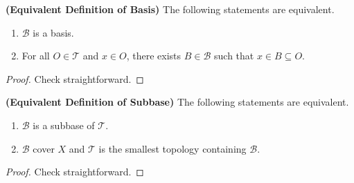 \documentclass{report}
\begin{document}
\begin{theorem}
  \textbf{(Equivalent Definition of Basis)} The following statements are equivalent.
\begin{enumerate}[label=(\alph*)]
  \item $\mathcal{B}$ is a basis.
  \item For all $O\in \mathscr{T }$ and $x\in O$, there exists $B \in \mathcal{B}$ such that $x \in B \subseteq O$.
\end{enumerate}
\end{theorem}
\begin{proof}
Check straightforward.
\end{proof}
\begin{theorem}
\textbf{(Equivalent Definition of Subbase)} The following statements are equivalent. 
\begin{enumerate}[label=(\alph*)]
  \item $\mathcal{B}$ is a subbase of $\mathscr{T }$. 
  \item $\mathcal{B}$ cover $X$ and $\mathscr{T }$ is the smallest topology containing $\mathcal{B}$. 
\end{enumerate}
\end{theorem}
\begin{proof}
Check straightforward. 
\end{proof}
\end{document}
